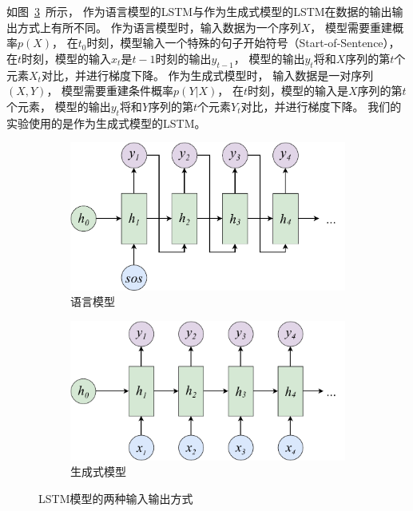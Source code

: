 如图~\ref{fig:LSTM_IO}~所示，
作为语言模型的LSTM与作为生成式模型的LSTM在数据的输出输出方式上有所不同。
作为语言模型时，输入数据为一个序列$X$，
模型需要重建概率$p(X)$，
在$t_0$时刻，模型输入一个特殊的句子开始符号（Start-of-Sentence），
在$t$时刻，模型的输入$x_t$是$t-1$时刻的输出$y_{t-1}$，
模型的输出$y_t$将和$X$序列的第$t$个元素$X_t$对比，并进行梯度下降。
作为生成式模型时，
输入数据是一对序列$(X, Y)$，
模型需要重建条件概率$p(Y|X)$，
在$t$时刻，模型的输入是$X$序列的第$t$个元素，
模型的输出$y_t$将和$Y$序列的第$t$个元素$Y_t$对比，并进行梯度下降。
我们的实验使用的是作为生成式模型的LSTM。
\begin{figure}[H]
    \begin{subfigure}{0.4\linewidth}
        \includegraphics[width=\linewidth]{figure/drawio/RNNLM_lm_v2.pdf}
        \centering
        \caption{语言模型}
        \label{fig:RNNLM_}
    \end{subfigure}%
    \begin{subfigure}{0.4\linewidth}
        \includegraphics[width=\linewidth]{figure/drawio/RNNLM_generative_v1.pdf}
        \centering
        \caption{生成式模型}
        \label{fig:RNNLM_generative_v1}
    \end{subfigure}
    \centering
    \caption{LSTM模型的两种输入输出方式}
    \label{fig:LSTM_IO}
\end{figure}

